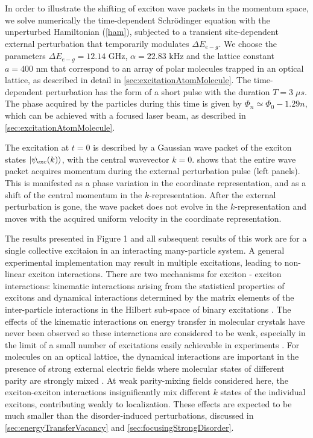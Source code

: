 In order to illustrate the shifting of exciton wave packets in the
momentum space, we solve numerically the time-dependent
Schr\"{o}dinger equation with the unperturbed Hamiltonian
(\ref{ham}),  subjected to a transient site-dependent external
perturbation that temporarily modulates $\Delta E_{e-g}$.
We choose the parameters $\Delta E_{e-g} =12.14\mbox{ GHz}$, $\alpha =22.83\mbox{ kHz}$ and the lattice constant $a=400\mbox{ nm}$ that correspond to an array of
polar molecules trapped in an optical lattice, as described in detail in \autoref{sec:excitationAtomMolecule}.
The time-dependent perturbation has the form of a short pulse with the duration $T = 3\; \mu s$. %
The phase acquired by the particles during this time is given by $\Phi_n \simeq \Phi_0  -1.29 n $, which can be achieved with a focused laser beam, as described in \autoref{sec:excitationAtomMolecule}.



The excitation at $t=0$ is described by
a Gaussian wave packet of the exciton states $|\psi_{\rm
exc}(k)\rangle$, with the central wavevector $k=0$.
 shows that the
entire wave packet acquires momentum during the external perturbation pulse (left
panels). This is manifested as a phase variation in the coordinate
representation, and as a shift of the central momentum in the
$k$-representation. After the external perturbation is gone, the
wave packet does not evolve in the $k$-representation and moves
with the acquired uniform velocity in the coordinate
representation.

The results presented in Figure 1 and all subsequent results of this work are for a single 
collective excitaion in an interacting many-particle system. A general experimental implementation may result in 
multiple excitations, leading to non-linear exciton interactions. There are two mechanisms for exciton - exciton 
interactions: kinematic interactions arising from the statistical properties of excitons and dynamical 
interactions determined by the matrix elements of the inter-particle interactions in the Hilbert sub-space of binary 
excitations \cite{agranovich, marina-bookchapter}. The effects of the kinematic interactions on energy transfer
 in molecular crystals have never been observed so these interactions are considered to be weak, especially in the
 limit of a small number of excitations easily achievable in experiments \cite{kinematic-biexciton-agranovich}. For molecules 
on an optical lattice, the dynamical interactions are important in the presence of strong external electric fields where
 molecular states of different parity are strongly mixed \cite{biexcitons, felipe}.
At weak parity-mixing fields considered here, the exciton-exciton interactions insignificantly mix different $k$ states
 of the individual excitons, contributing weakly  to localization. These effects are expected to be much smaller than
 the disorder-induced perturbations,  discussed in \autoref{sec:energyTransferVacancy}  and \autoref{sec:focusingStrongDisorder}.










